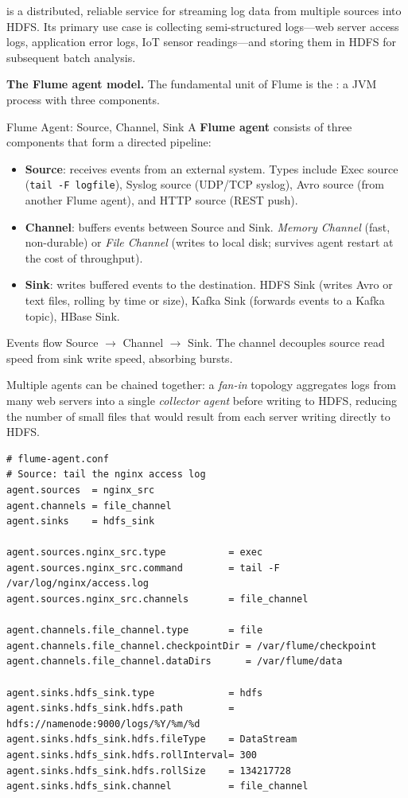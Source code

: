  is a distributed, reliable service for streaming log
data from multiple sources into HDFS. Its primary use case is collecting
semi-structured logs---web server access logs, application error logs,
IoT sensor readings---and storing them in HDFS for subsequent batch
analysis.

\textbf{The Flume agent model.} The fundamental unit of Flume is the
: a JVM process with three components.

\begin{defbox}{Flume Agent: Source, Channel, Sink}
A \textbf{Flume agent} consists of three components that form a directed
pipeline:
\begin{itemize}
  \item \textbf{Source}: receives events from an external system. Types
        include Exec source (\texttt{tail -F logfile}), Syslog source
        (UDP/TCP syslog), Avro source (from another Flume agent), and
        HTTP source (REST push).
  \item \textbf{Channel}: buffers events between Source and Sink.
        \emph{Memory Channel} (fast, non-durable) or \emph{File Channel}
        (writes to local disk; survives agent restart at the cost of
        throughput).
  \item \textbf{Sink}: writes buffered events to the destination.
        HDFS Sink (writes Avro or text files, rolling by time or size),
        Kafka Sink (forwards events to a Kafka topic), HBase Sink.
\end{itemize}
Events flow Source $\to$ Channel $\to$ Sink. The channel decouples
source read speed from sink write speed, absorbing bursts.
\end{defbox}

Multiple agents can be chained together: a \emph{fan-in} topology
aggregates logs from many web servers into a single \emph{collector agent}
before writing to HDFS, reducing the number of small files that would
result from each server writing directly to HDFS.

\begin{lstlisting}[style=shell, caption={Flume: agent configuration for web log collection}]
# flume-agent.conf
# Source: tail the nginx access log
agent.sources  = nginx_src
agent.channels = file_channel
agent.sinks    = hdfs_sink

agent.sources.nginx_src.type           = exec
agent.sources.nginx_src.command        = tail -F /var/log/nginx/access.log
agent.sources.nginx_src.channels       = file_channel

agent.channels.file_channel.type       = file
agent.channels.file_channel.checkpointDir = /var/flume/checkpoint
agent.channels.file_channel.dataDirs      = /var/flume/data

agent.sinks.hdfs_sink.type             = hdfs
agent.sinks.hdfs_sink.hdfs.path        = hdfs://namenode:9000/logs/%Y/%m/%d
agent.sinks.hdfs_sink.hdfs.fileType    = DataStream
agent.sinks.hdfs_sink.hdfs.rollInterval= 300
agent.sinks.hdfs_sink.hdfs.rollSize    = 134217728
agent.sinks.hdfs_sink.channel          = file_channel
\end{lstlisting}

